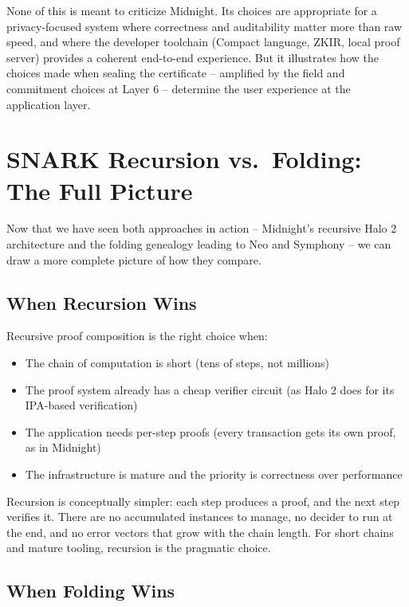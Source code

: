 \documentclass[
  11pt,
  openany]{report}
\providecommand{\tightlist}{%
  \setlength{\itemsep}{0pt}\setlength{\parskip}{0pt}}
\begin{document}
None of this is meant to criticize Midnight. Its choices are appropriate for a
privacy-focused system where correctness and auditability matter more than raw
speed, and where the developer toolchain (Compact language, ZKIR, local proof
server) provides a coherent end-to-end experience. But it illustrates how the
choices made when sealing the certificate -- amplified by the field and
commitment choices at Layer 6 -- determine the user experience at the
application layer.

\section{SNARK Recursion vs.~Folding: The Full
Picture}\label{snark-recursion-vs.-folding-the-full-picture}

Now that we have seen both approaches in action -- Midnight's recursive Halo 2
architecture and the folding genealogy leading to Neo and Symphony -- we can
draw a more complete picture of how they compare.

\subsection{When Recursion Wins}\label{when-recursion-wins}

Recursive proof composition is the right choice when:

\begin{itemize}
\tightlist
\item
  The chain of computation is short (tens of steps, not millions)
\item
  The proof system already has a cheap verifier circuit (as Halo 2 does for its
  IPA-based verification)
\item
  The application needs per-step proofs (every transaction gets its own proof,
  as in Midnight)
\item
  The infrastructure is mature and the priority is correctness over performance
\end{itemize}

Recursion is conceptually simpler: each step produces a proof, and the next step
verifies it. There are no accumulated instances to manage, no decider to run at
the end, and no error vectors that grow with the chain length. For short chains
and mature tooling, recursion is the pragmatic choice.

\subsection{When Folding Wins}\label{when-folding-wins}
\end{document}
